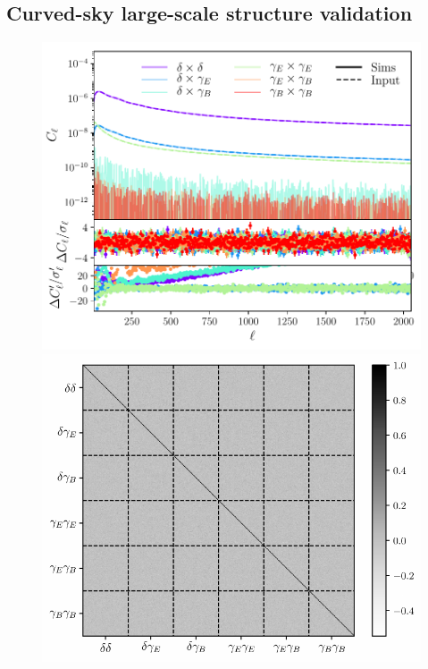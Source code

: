 \documentclass[usenatbib]{mnrasb}
\begin{document}
    \subsection{Curved-sky large-scale structure validation}\label{ssec:validation.lss_full}
      \begin{figure}
        \centering
        \includegraphics[width=0.99\columnwidth]{val_cl_lss_sph}
        \includegraphics[width=0.99\columnwidth]{val_covar_lss_sph}

\end{figure}
\end{document}
